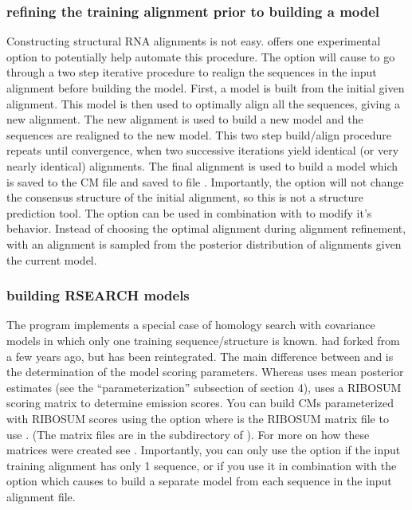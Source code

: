 \subsubsection{refining the training alignment prior to building a model}
Constructing structural RNA alignments is not easy. 
offers one experimental option to potentially help automate this
procedure. The  option will cause  to
go through a two step iterative procedure to realign the sequences in
the input alignment before building the model. First, a model is built
from the initial given alignment. This model is then used to optimally
align all the sequences, giving a new alignment. The new alignment is
used to build a new model and the sequences are realigned to the new
model. This two step build/align procedure repeats until convergence,
when two successive iterations yield identical (or very nearly
identical) alignments. The final alignment is used to build a model
which is saved to the CM file and saved to file
. Importantly, the  option will not change
the consensus structure of the initial alignment, so this is not a
structure prediction tool. The  option can be used in
combination with  to modify it's behavior. Instead of
choosing the optimal alignment during alignment refinement, with
 an alignment is sampled from the posterior distribution
of alignments given the current model.

\subsubsection{building RSEARCH models}
The  program \cite{KleinEddy03} implements a special case of
homology search with covariance models in which only one training
sequence/structure is known.  had forked from
 a few years ago, but has been reintegrated.
The main difference between 
and  is the determination of the model scoring
parameters. Whereas  uses mean posterior estimates
(see the ``parameterization'' subsection of section 4),
 uses a RIBOSUM scoring matrix to determine
emission scores. You can build CMs parameterized with
RIBOSUM scores using the  option where 
is the RIBOSUM matrix file to use . (The matrix files are in the
 subdirectory of ). For more on how
these matrices were created see \cite{KleinEddy03}. Importantly, you
can only use the  option if the input training
alignment has only 1 sequence, or if you use it in combination with
the  option which causes  to build a
separate model from each sequence in the input alignment file.

